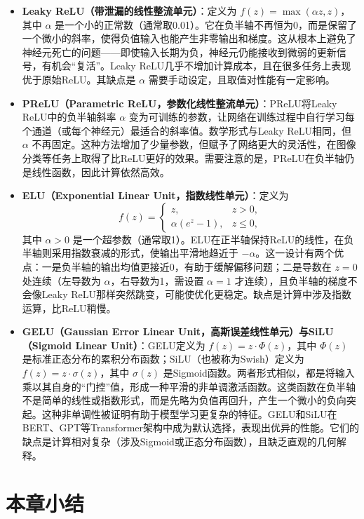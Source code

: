 \documentclass[lang=cn,zihao=-4,a4paper,fontset=windows]{beautybook}
\begin{document}
\begin{itemize}
    \item \textbf{Leaky ReLU（带泄漏的线性整流单元）}：定义为 $f(z) = \max(\alpha z, z)$，其中 $\alpha$ 是一个小的正常数（通常取0.01）。它在负半轴不再恒为0，而是保留了一个微小的斜率，使得负值输入也能产生非零输出和梯度。这从根本上避免了神经元死亡的问题——即使输入长期为负，神经元仍能接收到微弱的更新信号，有机会“复活”。Leaky ReLU几乎不增加计算成本，且在很多任务上表现优于原始ReLU。其缺点是 $\alpha$ 需要手动设定，且取值对性能有一定影响。
    \item \textbf{PReLU（Parametric ReLU，参数化线性整流单元）}：PReLU将Leaky ReLU中的负半轴斜率 $\alpha$ 变为可训练的参数，让网络在训练过程中自行学习每个通道（或每个神经元）最适合的斜率值。数学形式与Leaky ReLU相同，但 $\alpha$ 不再固定。这种方法增加了少量参数，但赋予了网络更大的灵活性，在图像分类等任务上取得了比ReLU更好的效果。需要注意的是，PReLU在负半轴仍是线性函数，因此计算依然高效。
    \item \textbf{ELU（Exponential Linear Unit，指数线性单元）}：定义为
    \[
    f(z) = \begin{cases}
        z, & z > 0, \\
        \alpha (e^z - 1), & z \leq 0,
    \end{cases}
    \]
    其中 $\alpha > 0$ 是一个超参数（通常取1）。ELU在正半轴保持ReLU的线性，在负半轴则采用指数衰减的形式，使输出平滑地趋近于 $-\alpha$。这一设计有两个优点：一是负半轴的输出均值更接近0，有助于缓解偏移问题；二是导数在 $z=0$ 处连续（左导数为 $\alpha$，右导数为1，需设置 $\alpha=1$ 才连续），且负半轴的梯度不会像Leaky ReLU那样突然跳变，可能使优化更稳定。缺点是计算中涉及指数运算，比ReLU稍慢。
    \item \textbf{GELU（Gaussian Error Linear Unit，高斯误差线性单元）与SiLU（Sigmoid Linear Unit）}：GELU定义为 $f(z) = z \cdot \Phi(z)$，其中 $\Phi(z)$ 是标准正态分布的累积分布函数；SiLU（也被称为Swish）定义为 $f(z) = z \cdot \sigma(z)$，其中 $\sigma(z)$ 是Sigmoid函数。两者形式相似，都是将输入乘以其自身的“门控”值，形成一种平滑的非单调激活函数。这类函数在负半轴不是简单的线性或指数形式，而是先略为负值再回升，产生一个微小的负向突起。这种非单调性被证明有助于模型学习更复杂的特征。GELU和SiLU在BERT、GPT等Transformer架构中成为默认选择，表现出优异的性能。它们的缺点是计算相对复杂（涉及Sigmoid或正态分布函数），且缺乏直观的几何解释。
\end{itemize}

\section*{本章小结}
\end{document}
